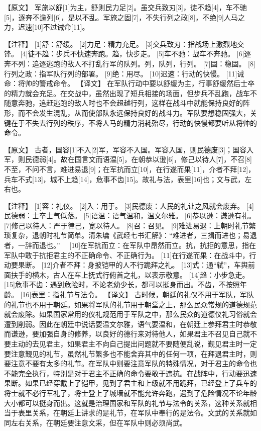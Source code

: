 \documentclass[a4paper,12pt,UTF8,twoside]{ctexbook}
\begin{document}
【原文】
军旅以舒[1]为主，舒则民力足[2]。虽交兵致刃[3]，徒不趋[4]，车不驰[5]，逐奔不逾列[6]，是以不乱。军旅之固[7]，不失行列之政[8]，不绝[9]人马之力，迟速[10]不过诫命[11]。



【注释】
[1]舒：舒缓。
[2]力足：精力充足。
[3]交兵致刃：指战场上激烈地交锋。
[4]徒不趋：步兵不快速奔跑。趋，快步走。
[5]车不驰：战车不奔驰。
[6]逐奔不列：追逐逃跑的敌人不打乱行军的队列。列，队列，行列。
[7]固：稳固。
[8]行列之政：指军队行列的部署。
[9]绝：用尽。
[10]迟速：行动的快慢。
[11]诫命：将帅的警戒命令。
【译文】
在军队行动中要以舒缓为主，行事舒缓然后士卒的精力就会充足。在交战中，虽然出现了短兵相接的场面，但步兵不乱跑，战车不随意奔驰，追赶逃跑的敌人时也不会超越行列，这样在战斗中就能保持良好的阵形，而不会发生混乱，从而使部队永远保持良好的战斗力。军队要想稳固强大，关键在于不失去行列的秩序，不将人马的精力消耗殆尽，行动的快慢都要听从将帅的命令。

【原文】
古者，国容[1]不入[2]军，军容不入国。军容入国，则民德废[3]；国容入军，则民德弱[4]。故在国言文而语温[5]，在朝恭以逊[6]，修己以待人[7]，不召[8]不至，不问不言，难进易退[9]；在军抗而立[10]，在行遂而果[11]，介者不拜[12]，兵车不式[13]，城不上趋[14]，危事不齿[15]。故礼与法，表里[16]也；文与武，左右也。



【注释】
[1]容：礼仪。
[2]入：用于。
[3]民德废：人民的礼让之风就会废弃。
[4]民德弱：士卒士气低落。
[5]语温：语气温和，温文尔雅。
[6]恭以逊：谦逊有礼。
[7]修己以待人：严于律己，宽以待人。
[8]召：召见。
[9]难进易退：上朝时礼节繁琐复杂，退朝时礼节简单。清朱墉《武经七书汇解》：“难进者，三揖而进也；易退者，一辞而退也。”
　[10]在军抗而立：在军队中昂然而立。抗，抗拒的意思，指在军队中敢于抗拒君主的不正确命令、不正确行为。
[11]在行遂而果：在战斗中，行动要果断。
[12]介者不拜：身披铠甲的人不行跪拜之礼。
[13]式：通“轼”，车舆前面扶手的横木，古人在车上抚式行俯首之礼，以表示敬意。
[14]趋：小步急走。
[15]危事不齿：遇到危险时，不论老幼少长，都可以挺身而出。不齿，不按照年龄。
[16]表里：指礼节与法令。
【译文】
古时候，朝廷的礼仪不用于军队，军队的礼节也不用于朝廷。如果将军队的礼节用于朝堂之上，那么民众常规的道德规范就会废除。如果国家常用的仪礼规范用于军队之中，那么民众的道德仪礼习俗就会遭到削弱。因此在朝廷中说话要温文尔雅，语气要温和，在朝廷上参拜君主时恭敬而谦逊，要加强自身的修养，以良好的德行来对待他人，如果君主不召见自己就不要主动的去见君主，如果君主不向自己提出问题就不要随便乱说，觐见君主时一定要注意觐见的礼节，虽然礼节繁多也不能舍弃其中的任何一项，在拜退君主时，则要注意不要有太多的礼节。在军队中则要注意军队的特殊情况，对于君主的命令也不能完全执行，特别是对于君主不正确的命令要敢于违抗。在战阵中，行动要迅速果断。如果已经穿戴上了铠甲，见到了君主和上级就不用跪拜，已经登上了兵车的将士就不必行军礼了，将士登上了城墙就不能允许奔跑，遇到了危险情况不论年龄大小都可以挺身而出。这就是治理国家和军队的礼节与法令的关系，这种关系就相当于表里关系，在朝廷上讲求的是礼节，在军队中奉行的是法令。文武的关系就如同左右关系，在朝廷要注意文采，但在军队中则必须尚武。
\end{document}
